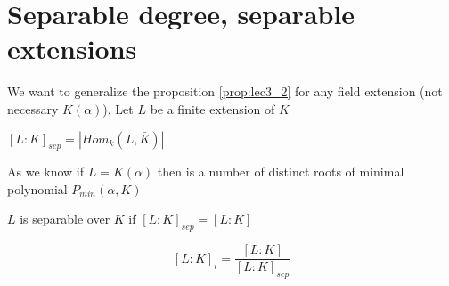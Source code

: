 \section{Separable degree, separable extensions}

We want to generalize the proposition \ref{prop:lec3_2} for any field
extension (not necessary $K\left(\alpha\right)$).
Let $L$ be a finite extension of $K$

\begin{definition}
  $\left[L:K\right]_{sep} = \left|Hom_k\left(L, \bar{K}\right)\right|$  
  \label{def:separabledegree}
\end{definition}

As we know if $L = K\left(\alpha\right)$ then
 is a number of distinct roots of
minimal polynomial $P_{min}\left(\alpha, K\right)$

\begin{definition}
  $L$ is separable over $K$ if
  $\left[L:K\right]_{sep} = \left[L:K\right]$
  \label{def:separableextension}
\end{definition}

\begin{definition}
  \[
  \left[L:K\right]_i =
  \frac{\left[L:K\right]}{\left[L:K\right]_{sep}}
  \]
  \label{def:inseparabledegree}
\end{definition}

